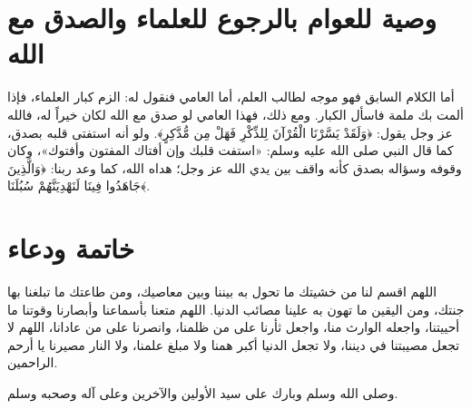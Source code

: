 \section{وصية للعوام بالرجوع للعلماء والصدق مع الله}
أما الكلام السابق فهو موجه لطالب العلم، أما العامي فنقول له: الزم كبار العلماء، فإذا ألمت بك ملمة فاسأل الكبار. 
ومع ذلك، فهذا العامي لو صدق مع الله لكان خيراً له، فالله عز وجل يقول: ﴿وَلَقَدْ يَسَّرْنَا الْقُرْآنَ لِلذِّكْرِ فَهَلْ مِن مُّدَّكِرٍ﴾. ولو أنه استفتى قلبه بصدق، كما قال النبي صلى الله عليه وسلم: «استفت قلبك وإن أفتاك المفتون وأفتوك»، وكان وقوفه وسؤاله بصدق كأنه واقف بين يدي الله عز وجل؛ هداه الله، كما وعد ربنا: ﴿وَالَّذِينَ جَاهَدُوا فِينَا لَنَهْدِيَنَّهُمْ سُبُلَنَا﴾.

\section{خاتمة ودعاء}
اللهم اقسم لنا من خشيتك ما تحول به بيننا وبين معاصيك، ومن طاعتك ما تبلغنا بها جنتك، ومن اليقين ما تهون به علينا مصائب الدنيا. اللهم متعنا بأسماعنا وأبصارنا وقوتنا ما أحييتنا، واجعله الوارث منا، واجعل ثأرنا على من ظلمنا، وانصرنا على من عادانا، اللهم لا تجعل مصيبتنا في ديننا، ولا تجعل الدنيا أكبر همنا ولا مبلغ علمنا، ولا النار مصيرنا يا أرحم الراحمين.

وصلى الله وسلم وبارك على سيد الأولين والآخرين وعلى آله وصحبه وسلم.